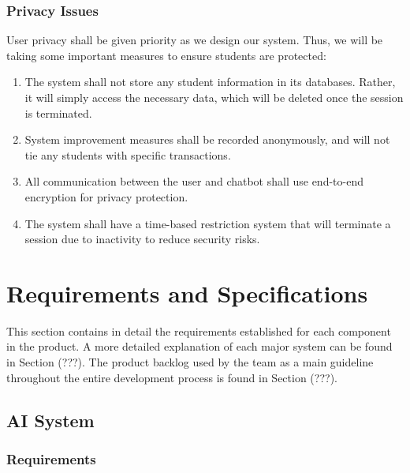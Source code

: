 \documentclass[titlepage, 12pt]{article}
\begin{document}
\subsubsection{Privacy Issues}

User privacy shall be given priority as we design our system. Thus, we will be taking some important measures to ensure students are protected:

\begin{enumerate}
    \item The system shall not store any student information in its databases. Rather, it will simply access the necessary data, which will be deleted once the session is terminated.
    \item System improvement measures shall be recorded anonymously, and will not tie any students with specific transactions.
    \item All communication between the user and chatbot shall use end-to-end encryption for privacy protection.
    \item The system shall have a time-based restriction system that will terminate a session due to inactivity to reduce security risks.
\end{enumerate}

\pagebreak

\section{Requirements and Specifications}

This section contains in detail the requirements established for each component in the product. A more detailed explanation of each major system can be found in Section (???). The product backlog used by the team as a main guideline throughout the entire development process is found in Section (???).

\subsection{AI System}

\subsubsection{Requirements}
\end{document}
